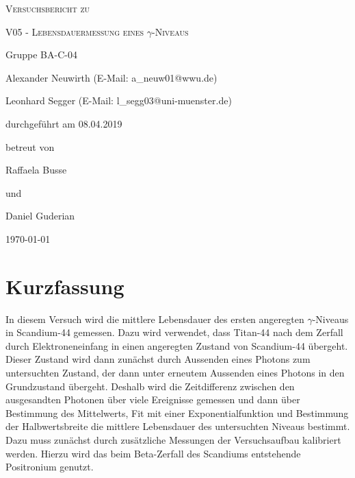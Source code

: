 \documentclass[
	a4paper,
	12pt,
	pagesize,
	ngerman
]{scrartcl}
\begin{document}
	\begin{titlepage}
		\centering
		{\scshape\LARGE Versuchsbericht zu \par}
		\vspace{1cm}
		{\scshape\huge V05 - Lebensdauermessung eines $\gamma$-Niveaus \par}
		\vspace{2.5cm}
		{\LARGE Gruppe BA-C-04 \par}
		\vspace{0.5cm}

		{\large Alexander Neuwirth (E-Mail: a\_neuw01@wwu.de) \par}
		{\large Leonhard Segger (E-Mail: l\_segg03@uni-muenster.de) \par}
		\vfill

		durchgeführt am 08.04.2019\par
		betreut von\par
		{\large Raffaela Busse} \par %
		und \par
		{\large Daniel Guderian}
		\vfill

		{\large \today\par}
	\end{titlepage}
	\tableofcontents
	\newpage


	\section{Kurzfassung}
	In diesem Versuch wird die mittlere Lebensdauer des ersten angeregten $\gamma$-Niveaus in Scandium-44 gemessen.
	Dazu wird verwendet, dass Titan-44 nach dem Zerfall durch Elektroneneinfang in einen angeregten Zustand von Scandium-44 übergeht.
	Dieser Zustand wird dann zunächst durch Aussenden eines Photons zum untersuchten Zustand, der dann unter erneutem Aussenden eines Photons in den Grundzustand übergeht.
	Deshalb wird die Zeitdifferenz zwischen den ausgesandten Photonen über viele Ereignisse gemessen und dann über Bestimmung des Mittelwerts, Fit mit einer Exponentialfunktion und Bestimmung der Halbwertsbreite die mittlere Lebensdauer des untersuchten Niveaus bestimmt.
	Dazu muss zunächst durch zusätzliche Messungen der Versuchsaufbau kalibriert werden.
	Hierzu wird das beim Beta-Zerfall des Scandiums entstehende Positronium genutzt.
\end{document}
